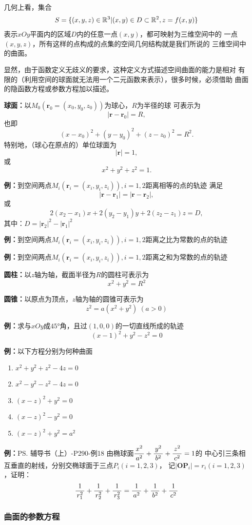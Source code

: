 几何上看，集合
$$S=\{(x,y,z)\in\mathbb{{R}}^3|(x,y)\in D\subset\mathbb{{R}}^2,
z=f(x,y)\}$$
表示$xOy$平面内的区域$D$内的任意一点$(x,y)$，都可映射为三维空间中的
一点$(x,y,z)$，所有这样的点构成的点集的空间几何结构就是我们所说的
三维空间中的曲面。

显然，由于函数定义无歧义的要求，这种定义方式描述空间曲面的能力是相对
有限的（利用空间的球面就无法用一个二元函数来表示），很多时候，必须借助
曲面的隐函数方程或参数方程加以描述。

{\bf 球面：}以$M_0(\bm{r}_0=(x_0,y_0,z_0))$为球心，$R$为半径的球
可表示为
$$|\bm{r}-\bm{r}_0|=R,$$ 
也即
$$(x-x_0)^2+(y-y_0)^2+(z-z_0)^2=R^2.$$ 
特别地，（球心在原点的）单位球面为
$$|\bm{r}|=1,$$
或
$$x^2+y^2+z^2=1.$$

{\bf 例：}到空间两点$M_i(\bm{r}_i=(x_i,y_i,z_i)),i=1,2$距离相等的点的轨迹
满足
$${|\bm{r}-\bm{r}_1|=|\bm{r}-\bm{r}_2|},$$
或
$${2(x_2-x_1)x+2(y_2-y_1)y+2(z_2-z_1)z=D,}$$
其中：$D=|\bm{r}_2|^2-|\bm{r}_1|^2$

{\bf 例：}到空间两点$M_i(\bm{r}_i=(x_i,y_i,z_i)),i=1,2$距离之比为常数的点的轨迹

{\bf 例：}到空间两点$M_i(\bm{r}_i=(x_i,y_i,z_i)),i=1,2$距离之和为常数的点的轨迹

{\bf 圆柱：}以$z$轴为轴，截面半径为$R$的圆柱可表示为
$$x^2+y^2=R^2$$

{\bf 圆锥：}以原点为顶点，$z$轴为轴的圆锥可表示为
$$z^2=a(x^2+y^2)\;(a>0)$$

{\bf 例：}求与$xOy$成$45$°角，且过$(1,0,0)$的一切直线所成的轨迹
$$(x-1)^2+y^2-z^2=0$$

{\bf 例：}以下方程分别为何种曲面
\begin{enumerate}[(1)]
  \setlength{\itemindent}{1cm}
  \item $x^2+y^2+z^2-4z=0$  
  \item $x^2-y^2-z^2-4z=0$  
  \item $(x-z)^2+y^2=0$  
  \item $(x-z)^2-y^2=0$  
  \item $(x-z)^2+y^2=a^2$ 
\end{enumerate}

{\bf 例：}\ps{辅导书（上）-P290-例18}
由椭球面$\displaystyle\frac{\,{x^2}\,}{\,{a^2}\,}+\displaystyle\frac{\,{y^2}\,}{\,{b^2}\,}+\displaystyle\frac{\,{z^2}\,}{\,{c^2}\,}=1$的
中心引三条相互垂直的射线，分别交椭球面于三点$P_i(i=1,2,3)$，
记$|\bm{OP}_i|=r_i(i=1,2,3)$，证明：
$$\displaystyle\frac{\,{1}\,}{\,{r_1^2}\,}+\displaystyle\frac{\,{1}\,}{\,{r_2^2}\,}+\displaystyle\frac{\,{1}\,}{\,{r_3^2}\,}
=\displaystyle\frac{\,{1}\,}{\,{a^2}\,}+\displaystyle\frac{\,{1}\,}{\,{b^2}\,}+\displaystyle\frac{\,{1}\,}{\,{c^2}\,}$$

\subsubsection{曲面的参数方程}

